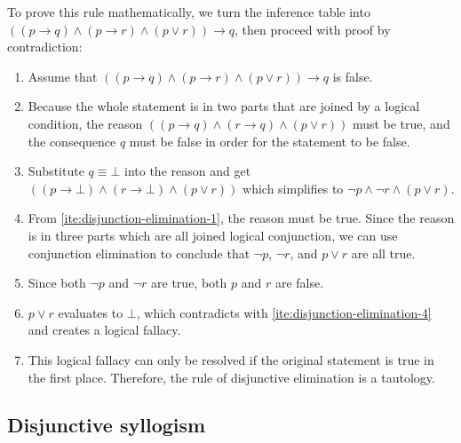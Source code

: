 To prove this rule mathematically, we turn the inference table into \(((p \to q) \land (p \to r) \land (p \lor r)) \to q\), then proceed with proof by contradiction:
\begin{enumerate}[noitemsep]
  \item Assume that \(((p \to q) \land (p \to r) \land (p \lor r)) \to q\) is false.
  \item\label{ite:disjunction-elimination-1} Because the whole statement is in two parts that are joined by a logical condition, the reason $((p \to q) \land (r \to q) \land (p \lor r))$ must be true, and the consequence $q$ must be false in order for the statement to be false.
  \item Substitute $q \equiv \bot$ into the reason and get $((p \to \bot) \land (r \to \bot) \land (p \lor r))$ which simplifies to $\neg p \land \neg r \land (p \lor r)$.
  \item\label{ite:disjunction-elimination-3} From \cref{ite:disjunction-elimination-1}, the reason must be true. Since the reason is in three parts which are all joined logical conjunction, we can use conjunction elimination to conclude that $\neg p$, $\neg r$, and $p \lor r$ are all true.
  \item\label{ite:disjunction-elimination-4} Since both $\neg p$ and $\neg r$ are true, both $p$ and $r$ are false.
  \item $p \lor r$ evaluates to $\bot$, which contradicts with \cref{ite:disjunction-elimination-4} and creates a logical fallacy.
  \item This logical fallacy can only be resolved if the original statement is true in the first place. Therefore, the rule of disjunctive elimination is a tautology.
\end{enumerate}

\subsection{Disjunctive syllogism}

